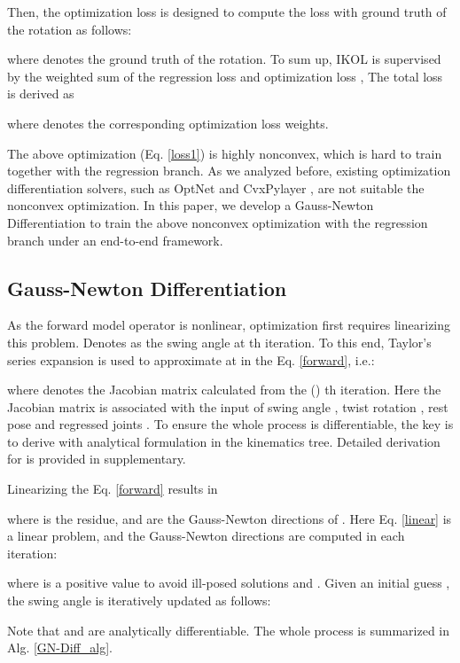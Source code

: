 \documentclass[letterpaper]{article} \usepackage{aaai23}  \usepackage{times}  \usepackage{helvet}  \usepackage{courier}  \usepackage[hyphens]{url}  \usepackage{graphicx} \urlstyle{rm} \def\UrlFont{\rm}  \usepackage{natbib}  \usepackage{caption} \frenchspacing  \setlength{\pdfpagewidth}{8.5in}  \setlength{\pdfpageheight}{11in}  \usepackage{algorithm}
\begin{document}
Then, the optimization loss is designed to compute the loss with  ground truth of the rotation as follows: 



 
where  denotes the ground truth of the rotation. To sum up, IKOL is supervised by the weighted sum of the regression loss  and optimization loss , The total loss  is derived as
 
where  denotes the corresponding optimization loss weights.

The above optimization (Eq. \ref{loss1}) is highly nonconvex, which is hard to train together with the regression branch. As we analyzed before, existing optimization differentiation solvers, such as OptNet \cite{amos2017optnet} and CvxPylayer \cite{agrawal2019differentiable}, are not suitable the nonconvex optimization. In this paper, we develop a Gauss-Newton Differentiation to train the above nonconvex optimization with the regression branch under an end-to-end framework. 

\subsection{Gauss-Newton Differentiation}
As the forward model operator  is nonlinear, optimization first requires linearizing this problem. Denotes  as the swing angle at th iteration. To this end, Taylor’s series expansion is used to approximate  at  in the Eq. \ref{forward}, i.e.:
 
where  denotes the Jacobian matrix calculated from the () th iteration. Here the Jacobian matrix  is associated with the input of swing angle , twist rotation , rest pose  and regressed joints . To ensure the whole process is differentiable, the key is to derive  with analytical formulation in the kinematics tree. Detailed derivation for  is provided in supplementary. 

Linearizing the Eq. \ref{forward} results in

 
where  is the residue, and  are the Gauss-Newton directions of . Here Eq. \ref{linear} is a linear problem, and the Gauss-Newton directions are computed in each iteration:




 
where  is a positive value to avoid ill-posed solutions and . Given an initial guess , the swing angle is iteratively updated as follows: 

 
Note that  and  are analytically differentiable. The whole process is summarized in Alg. \ref{GN-Diff_alg}. 
\end{document}

